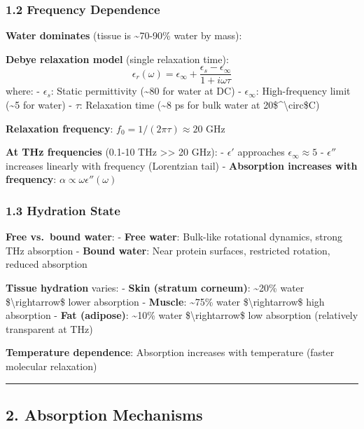 \subsubsection{1.2 Frequency Dependence}\label{frequency-dependence}

\textbf{Water dominates} (tissue is \textasciitilde70-90\% water by
mass):

\textbf{Debye relaxation model} (single relaxation time):
\[\epsilon_r(\omega) = \epsilon_\infty + \frac{\epsilon_s - \epsilon_\infty}{1 + i\omega \tau}\]
where: - \(\epsilon_s\): Static permittivity (\textasciitilde80 for
water at DC) - \(\epsilon_\infty\): High-frequency limit
(\textasciitilde5 for water) - \(\tau\): Relaxation time
(\textasciitilde8 ps for bulk water at 20\$\^{}\textbackslash circ\$C)

\textbf{Relaxation frequency}: \(f_0 = 1/(2\pi \tau) \approx 20\) GHz

\textbf{At THz frequencies} (0.1-10 THz \textgreater\textgreater{} 20
GHz): - \(\epsilon'\) approaches \(\epsilon_\infty \approx 5\) -
\(\epsilon''\) increases linearly with frequency (Lorentzian tail) -
\textbf{Absorption increases with frequency}:
\(\alpha \propto \omega \epsilon''(\omega)\)

\subsubsection{1.3 Hydration State}\label{hydration-state}

\textbf{Free vs.~bound water}: - \textbf{Free water}: Bulk-like
rotational dynamics, strong THz absorption - \textbf{Bound water}: Near
protein surfaces, restricted rotation, reduced absorption

\textbf{Tissue hydration} varies: - \textbf{Skin (stratum corneum)}:
\textasciitilde20\% water \$\textbackslash rightarrow\$ lower absorption
- \textbf{Muscle}: \textasciitilde75\% water
\$\textbackslash rightarrow\$ high absorption - \textbf{Fat (adipose)}:
\textasciitilde10\% water \$\textbackslash rightarrow\$ low absorption
(relatively transparent at THz)

\textbf{Temperature dependence}: Absorption increases with temperature
(faster molecular relaxation)

\begin{center}\rule{0.5\linewidth}{0.5pt}\end{center}

\subsection{2. Absorption Mechanisms}\label{absorption-mechanisms}

